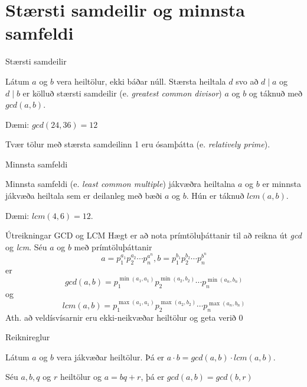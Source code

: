 \documentclass[handout]{beamer}
\begin{document}
\section{Stærsti samdeilir og minnsta samfeldi}

\begin{frame}{Stærsti samdeilir}
\begin{tcolorbox}[title=Stærsti samdeilir]
Látum $a$ og $b$ vera heiltölur, ekki báðar núll. Stærsta heiltala $d$ svo að $d\mid a$ og $d\mid b$ er kölluð stærsti samdeilir (e. \emph{greatest common divisor}) $a$ og $b$ og táknuð með $gcd(a, b)$.
\end{tcolorbox}
Dæmi: $gcd(24, 36) = 12$

Tvær tölur með stærsta samdeilinn 1 eru ósamþátta (e. \emph{relatively prime}).
\end{frame}

\begin{frame}{Minnsta samfeldi}
\begin{tcolorbox}[title=Minnsta samfeldi]
Minnsta samfeldi (e. \emph{least common multiple}) jákvæðra heiltalna $a$ og $b$ er minnsta jákvæða heiltala sem er deilanleg með bæði $a$ og $b$. Hún er táknuð $lcm(a, b)$.
\end{tcolorbox}
Dæmi: $lcm(4, 6) = 12$.
\end{frame}

\begin{frame}{Útreikningar GCD og LCM}
    Hægt er að nota prímtöluþáttanir til að reikna út \emph{gcd} og \emph{lcm}. Séu $a$ og $b$ með prímtöluþáttanir
    \[
        a = p_1^{a_1}p_2^{a_2}\cdots p_n^{a^n},b = p_1^{b_1}p_2^{b_2}\cdots p_n^{b^n}
    \]
    er
    \[
        gcd(a,b) = p_1^{\min(a_1,a_1)}p_2^{\min(a_2,b_2)} \cdots p_n^{\min(a_n,b_n)}
    \]
    og
    \[
        lcm(a,b) = p_1^{\max(a_1,a_1)}p_2^{\max(a_2,b_2)} \cdots p_n^{\max(a_n,b_n)}
    \]
    Ath. að veldísvísarnir eru ekki-neikvæðar heiltölur og geta verið 0
\end{frame}

\begin{frame}{Reiknireglur}
    \begin{tcolorbox}[title=GCD og LCM]
        Látum $a$ og $b$ vera jákvæðar heiltölur. Þá er $a\cdot b = gcd(a, b) \cdot lcm(a, b)$.
    \end{tcolorbox}

    \begin{tcolorbox}[title=GCD og deilingarafgangur]
        Séu $a,b,q$ og $r$ heiltölur og $a = bq + r$, þá er $gcd(a,b) = gcd(b,r)$
    \end{tcolorbox}
\end{frame}
\end{document}
